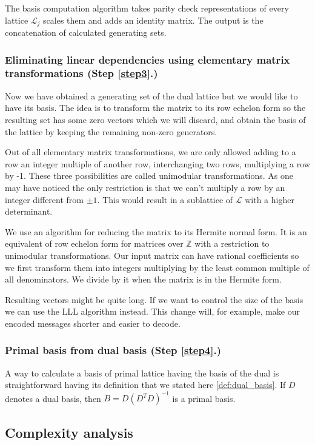 \documentclass[12pt]{article}
\newcommand{\ZZ}{\mathbb{Z}}
\newcommand{\LL}{\mathcal{L}}
\begin{document}
The basis computation algorithm takes parity check representations of every lattice $\LL_{j}$ scales them and adds an identity matrix. The output is the concatenation of calculated generating sets.

\subsubsection{Eliminating linear dependencies using elementary matrix transformations (Step \ref{step3}.)}
\label{subsubsec:hermite_form}
Now we have obtained a generating set of the dual lattice but we would like to have its basis. The idea is to transform the matrix to its row echelon form so the resulting set has some zero vectors which we will discard, and obtain the basis of the lattice by keeping the remaining non-zero generators.

Out of all elementary matrix transformations, we are only allowed adding to a row an integer multiple of another row, interchanging two rows, multiplying a row by -1. These three possibilities are called unimodular transformations. As one may have noticed the only restriction is that we can't multiply a row by an integer different from $\pm 1$. This would result in a sublattice of $\LL$ with a higher determinant.

We use an algorithm for reducing the matrix to its Hermite normal form. It is an equivalent of row echelon form for matrices over $\ZZ$ with a restriction to unimodular transformations. Our input matrix can have rational coefficients so we first transform them into integers multiplying by the least common multiple of all denominators. We divide by it when the matrix is in the Hermite form.

Resulting vectors might be quite long. If we want to control the size of the basis we can use the LLL algorithm instead. This change will, for example, make our encoded messages shorter and easier to decode.

\subsubsection{Primal basis from dual basis (Step \ref{step4}.)}
\label{subsubsec:primal_from_dual}
A way to calculate a basis of primal lattice having the basis of the dual is straightforward having its definition that we stated here \ref{def:dual_basis}. If $D$ denotes a dual basis, then $B = D(D^{T}D)^{-1}$ is  a primal basis.


\subsection{Complexity analysis}
\label{subsec:complexity_integers}
\end{document}

